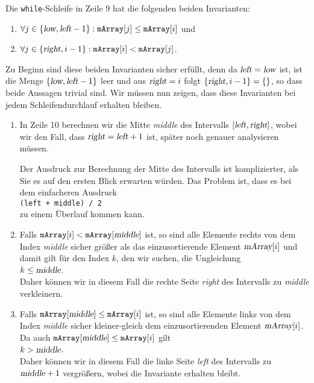 Die \texttt{while}-Schleife in Zeile 9 hat die folgenden beiden Invarianten:
\begin{enumerate}
\item $\forall j \in \{ \textsl{low}, \textsl{left} - 1 \} : \mathtt{mArray}[j] \leq
  \mathtt{mArray}[i]$ \quad und
\item $\forall j \in \{ \textsl{right}, i - 1 \} : \mathtt{mArray}[i] < \mathtt{mArray}[j]$.
\end{enumerate}
Zu Beginn sind diese beiden Invarianten sicher erf\"ullt, denn da $\textsl{left} = \textsl{low}$ ist,
ist die Menge $\{ \textsl{low}, \textsl{left} - 1 \}$ leer und aus $\textsl{right} = i$ folgt
$\{ \textsl{right}, i - 1 \} = \{\}$, so dass beide Aussagen trivial sind.  Wir m\"ussen nun zeigen,
dass diese Invarianten bei jedem Schleifendurchlauf erhalten bleiben.
\begin{enumerate}
\item In Zeile 10 berechnen wir die Mitte \textsl{middle} des Intervalls $[\textsl{left}, \textsl{right}]$,
      wobei wir den Fall, dass $\textsl{right} = \textsl{left} + 1$ ist, sp\"ater noch genauer
      analysieren m\"ussen.

      Der Ausdruck zur Berechnung der Mitte des Intervalls ist komplizierter, als Sie es auf den
      ersten Blick erwarten w\"urden.  Das Problem ist, dass es bei dem einfacheren Ausdruck
      \\[0.2cm]
      \hspace*{1.3cm}
      \texttt{(left + middle) / 2}
      \\[0.2cm]
      zu einem Überlauf kommen kann.
\item Falls $\mathtt{mArray}[i] < \mathtt{mArray}[\textsl{middle}]$ ist, so sind alle Elemente
      rechts von dem Index \textsl{middle} sicher gr\"o{\ss}er als das einzusortierende Element 
      $\textsl{mArray}[i]$ und damit gilt f\"ur den Index $k$, den wir suchen, die Ungleichung
      \\[0.2cm]
      \hspace*{1.3cm}
      $k \leq \textsl{middle}$.
      \\[0.2cm]
      Daher k\"onnen wir in diesem Fall die rechte Seite \textsl{right} des Intervalls zu \textsl{middle} verkleinern.
\item Falls $\mathtt{mArray}[\textsl{middle}] \leq \mathtt{mArray}[i]$ ist, so sind alle Elemente
      links von dem Index \textsl{middle} sicher kleiner-gleich dem einzusortierenden Element 
      $\textsl{mArray}[i]$. Da auch $\mathtt{mArray}[\textsl{middle}] \leq \mathtt{mArray}[i]$ gilt 
      \\[0.2cm]
      \hspace*{1.3cm}
      $k > \textsl{middle}$.
      \\[0.2cm]
      Daher k\"onnen wir in diesem Fall die linke Seite \textsl{left} des Intervalls zu $\textsl{middle}+1$
      vergr\"o{\ss}ern, wobei die Invariante erhalten bleibt.
\end{enumerate}
